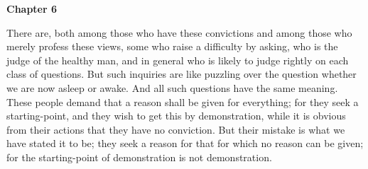 \textbf{Chapter 6}

There are, both among those who have these convictions and among those who merely profess these views, some who raise a difficulty by asking, who is the judge of the healthy man, and in general who is likely to judge rightly on each class of questions. But such inquiries are like puzzling over the question whether we are now asleep or awake. And all such questions have the same meaning. These people demand that a reason shall be given for everything; for they seek a starting-point, and they wish to get this by demonstration, while it is obvious from their actions that they have no conviction. But their mistake is what we have stated it to be; they seek a reason for that for which no reason can be given; for the starting-point of demonstration is not demonstration.

